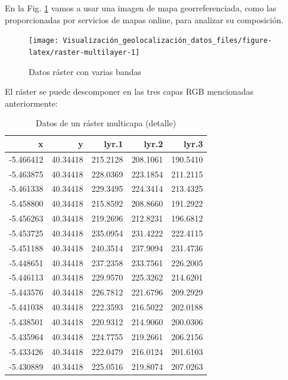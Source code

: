 \documentclass[
]{book}
\theoremstyle{definition}
\theoremstyle{definition}
\theoremstyle{definition}
\theoremstyle{definition}
\theoremstyle{remark}
\begin{document}
En la Fig. \ref{fig:raster-multilayer} vamos a usar una imagen de mapa
georreferenciada, como las proporcionadas por servicios de mapas online, para
analizar su composición.

\begin{figure}

{\centering \texttt{[image: Visualización\_geolocalización\_datos\_files/figure-latex/raster-multilayer-1]} 

}

\caption{Datos ráster con varias bandas}\label{fig:raster-multilayer}
\end{figure}

El ráster se puede descomponer en las tres capas RGB mencionadas anteriormente:

\begin{table}

\caption{\label{tab:detalle-pixel-multicapa}Datos de un ráster multicapa (detalle)}
\centering
\begin{tabular}[t]{r|r|r|r|r}
\hline
x & y & lyr.1 & lyr.2 & lyr.3\\
\hline
-5.466412 & 40.34418 & 215.2128 & 208.1061 & 190.5410\\
\hline
-5.463875 & 40.34418 & 228.0369 & 223.1854 & 211.2115\\
\hline
-5.461338 & 40.34418 & 229.3495 & 224.3414 & 213.4325\\
\hline
-5.458800 & 40.34418 & 215.8592 & 208.8660 & 191.2922\\
\hline
-5.456263 & 40.34418 & 219.2696 & 212.8231 & 196.6812\\
\hline
-5.453725 & 40.34418 & 235.0954 & 231.4222 & 222.4115\\
\hline
-5.451188 & 40.34418 & 240.3514 & 237.9094 & 231.4736\\
\hline
-5.448651 & 40.34418 & 237.2358 & 233.7561 & 226.2005\\
\hline
-5.446113 & 40.34418 & 229.9570 & 225.3262 & 214.6201\\
\hline
-5.443576 & 40.34418 & 226.7812 & 221.6796 & 209.2929\\
\hline
-5.441038 & 40.34418 & 222.3593 & 216.5022 & 202.0188\\
\hline
-5.438501 & 40.34418 & 220.9312 & 214.9060 & 200.0306\\
\hline
-5.435964 & 40.34418 & 224.7755 & 219.2661 & 206.2156\\
\hline
-5.433426 & 40.34418 & 222.0479 & 216.0124 & 201.6103\\
\hline
-5.430889 & 40.34418 & 225.0516 & 219.8074 & 207.0263\\
\hline
\end{tabular}
\end{table}
\end{document}
